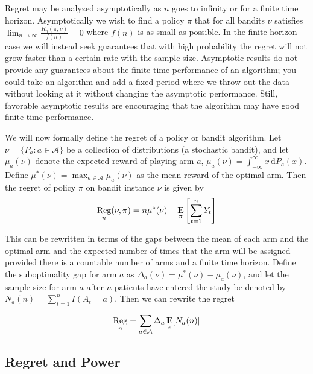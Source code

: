 \documentclass[12pt,,letterpaper,twoside]{report}
\DeclareMathOperator{\E}{{\rm I\kern-.3em E}}
\DeclareMathOperator{\Reg}{\rm Reg}
\begin{document}
Regret may be analyzed asymptotically as \(n\) goes to infinity or for a
finite time horizon. Asymptotically we wish to find a policy \(\pi\)
that for all bandits \(\nu\) satisfies
\(\lim_{n \to \infty} \frac{R_n(\pi, \nu)}{f(n)} = 0\) where \(f(n)\) is
as small as possible. In the finite-horizon case we will instead seek
guarantees that with high probability the regret will not grow faster
than a certain rate with the sample size. Asymptotic results do not
provide any guarantees about the finite-time performance of an
algorithm; you could take an algorithm and add a fixed period where we
throw out the data without looking at it without changing the asymptotic
performance. Still, favorable asymptotic results are encouraging that
the algorithm may have good finite-time performance.

We will now formally define the regret of a policy or bandit algorithm.
Let \(\nu = \{P_a: a \in \mathcal{A}\}\) be a collection of
distributions (a stochastic bandit), and let \(\mu_a(\nu)\) denote the
expected reward of playing arm \(a\),
\(\mu_a(\nu) = \int_{-\infty}^{\infty} x \, \mathrm{d}P_a(x)\). Define
\(\mu^*(\nu) = \max_{a \in \mathcal{A}} \mu_a(\nu)\) as the mean reward
of the optimal arm. Then the regret of policy \(\pi\) on bandit instance
\(\nu\) is given by
\[\Reg_n(\nu, \pi) = n\mu^*(\nu) - \E_{\pi} \left[\sum_{t = 1}^n Y_t \right]\]

This can be rewritten in terms of the gaps between the mean of each arm
and the optimal arm and the expected number of times that the arm will
be assigned provided there is a countable number of arms and a finite
time horizon. Define the suboptimality gap for arm \(a\) as
\(\Delta_a(\nu) = \mu^*(\nu) - \mu_a(\nu)\), and let the sample size for
arm \(a\) after \(n\) patients have entered the study be denoted by
\(N_a(n) = \sum_{t = 1}^n I(A_t = a)\). Then we can rewrite the regret

\[\Reg_n = \sum_{a \in \mathcal{A}}\Delta_a \E_{\pi}[N_a(n)]\]

\hypertarget{regret-and-power}{%
\subsection{Regret and Power}\label{regret-and-power}}
\end{document}
